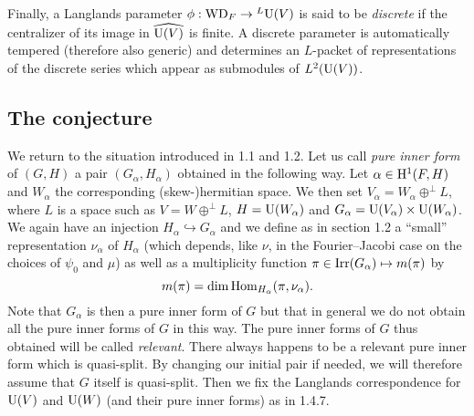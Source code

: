 Finally, a Langlands parameter $\phi: \mathrm{WD}_F \to {}^L \mathrm{U}(V)$ is said to be \emph{discrete} if the centralizer of its image in $\widehat{\mathrm{U}(V)}$ is finite.
A discrete parameter is automatically tempered (therefore also generic) and determines an $L$-packet of representations of the discrete series which appear as submodules of $L^2(\mathrm{U}(V))$.



\subsection{The conjecture}



We return to the situation introduced in 1.1 and 1.2.
Let us call \emph{pure inner form} of $(G, H)$ a pair $(G_\alpha,H_\alpha)$ obtained in the following way.
Let $\alpha \in \mathrm{H}^1(F, H)$ and $W_\alpha$ the corresponding (skew-)hermitian space.
We then set $V_\alpha = W_\alpha \oplus^\perp L$, where $L$ is a space such as $V = W \oplus^\perp L$, $H = \mathrm{U}(W_\alpha)$ and $G_\alpha = \mathrm{U}(V_\alpha) \times \mathrm{U}(W_\alpha)$.
We again have an injection $H_\alpha \hookrightarrow G_\alpha$ and we define as in section 1.2 a “small” representation $\nu_\alpha$ of $H_\alpha$ (which depends, like $\nu$, in the Fourier--Jacobi case on the choices of $\psi_0$ and $\mu$) as well as a multiplicity function $\pi\in \mathrm{Irr}(G_\alpha) \mapsto m(\pi)$ by
\[
    m(\pi) = \dim \mathrm{Hom}_{H_\alpha} (\pi, \nu_\alpha).
\]
Note that $G_\alpha$ is then a pure inner form of $G$ but that in general we do not obtain all the pure inner forms of $G$ in this way.
The pure inner forms of $G$ thus obtained will be called \emph{relevant}.
There always happens to be a relevant pure inner form which is quasi-split.
By changing our initial pair if needed, we will therefore assume that $G$ itself is quasi-split.
Then we fix the Langlands correspondence for $\mathrm{U}(V)$ and $\mathrm{U}(W)$ (and their pure inner forms) as in 1.4.7.

